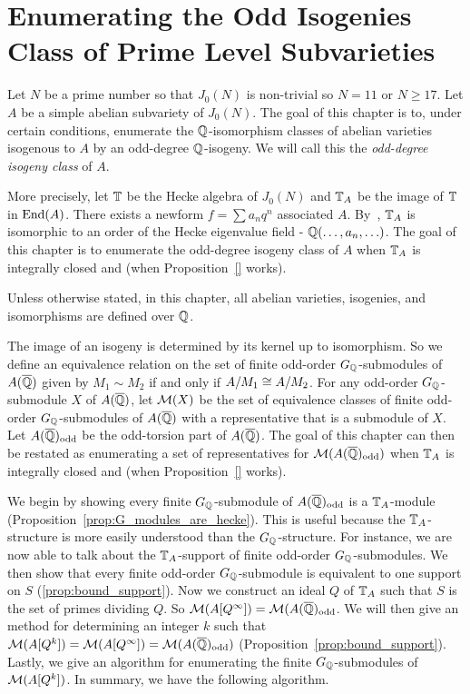 \documentclass[thesis.tex]{subfiles}
\begin{document}
    
\chapter{Enumerating the Odd Isogenies Class of Prime Level Subvarieties}%
\label{chap:isogeny_class}

Let $N$ be a prime number so that $J_0(N)$ is non-trivial so $N=11$ or $N\geq
17$. Let $A$ be a simple abelian subvariety of $J_0(N)$. The goal of this
chapter is to, under certain conditions, enumerate the $\mathbb{Q}$-isomorphism
classes of abelian varieties isogenous to $A$ by an odd-degree $\mathbb{Q}$-isogeny.
We will call this the \emph{odd-degree isogeny class} of $A$.

More precisely, let $\mathbb{T}$ be the Hecke algebra of $J_0(N)$ and $\mathbb{T}_A$ be the
image of $\mathbb{T}$ in $\operatorname{End}(A)$. There exists a newform $f=\sum a_n q^n$ associated
$A$. By~\cite[Prop. 7.14]{shimura:intro}, $\mathbb{T}_A$ is isomorphic to an order of
the Hecke eigenvalue field - $\mathbb{Q}(\ldots,a_n,\ldots)$. The goal of this chapter
is to enumerate the odd-degree isogeny class of $A$ when $\mathbb{T}_A$ is integrally
closed and (when Proposition~\ref{} works).

Unless otherwise stated, in this chapter, all abelian varieties, isogenies, and
isomorphisms are defined over $\mathbb{Q}$.

The image of an isogeny is determined by its kernel up to isomorphism. So we
define an equivalence relation on the set of finite odd-order
$G_{\mathbb{Q}}$-submodules of $A(\overline{\mathbb{Q}})$ given by $M_1\sim M_2$ if and only if
$A/M_1\cong A/M_2$. For any odd-order $G_{\mathbb{Q}}$-submodule $X$ of $A(\overline{\mathbb{Q}})$, let
$\mathcal{M}(X)$ be the set of equivalence classes of finite odd-order
$G_{\mathbb{Q}}$-submodules of $A(\overline{\mathbb{Q}})$ with a representative that is a submodule of
$X$. Let $A(\overline{\mathbb{Q}})_{\mathrm{odd}}$ be the odd-torsion part of $A(\overline{\mathbb{Q}})$. The goal of
this chapter can then be restated as enumerating a set of representatives for
$\mathcal{M}(A(\overline{\mathbb{Q}})_{\mathrm{odd}})$ when $\mathbb{T}_A$ is integrally closed and (when
Proposition~\ref{} works). 

We begin by showing every finite $G_{\mathbb{Q}}$-submodule of $A(\overline{\mathbb{Q}})_{\mathrm{odd}}$ is a
$\mathbb{T}_A$-module (Proposition~\ref{prop:G_modules_are_hecke}). This is useful
because the $\mathbb{T}_A$-structure is more easily understood than the
$G_{\mathbb{Q}}$-structure. For instance, we are now able to talk about the
$\mathbb{T}_A$-support of finite odd-order $G_{\mathbb{Q}}$-submodules. We then show that every
finite odd-order $G_{\mathbb{Q}}$-submodule is equivalent to one support on $S$
(\ref{prop:bound_support}). Now we construct an ideal $Q$ of $\mathbb{T}_A$ such that
$S$ is the set of primes dividing $Q$. So $\mathcal{M}(A[Q^\infty])=\mathcal{M}(A(\overline{\mathbb{Q}})_{\mathrm{odd}}$.
We will then give an method for determining an integer $k$ such that
$\mathcal{M}(A[Q^k])=\mathcal{M}(A[Q^\infty])=\mathcal{M}(A(\overline{\mathbb{Q}})_{\mathrm{odd}})$
(Proposition~\ref{prop:bound_support}). Lastly, we give an algorithm for
enumerating the finite $G_{\mathbb{Q}}$-submodules of $\mathcal{M}(A[Q^k])$. In summary, we have
the following algorithm.
\end{document}
